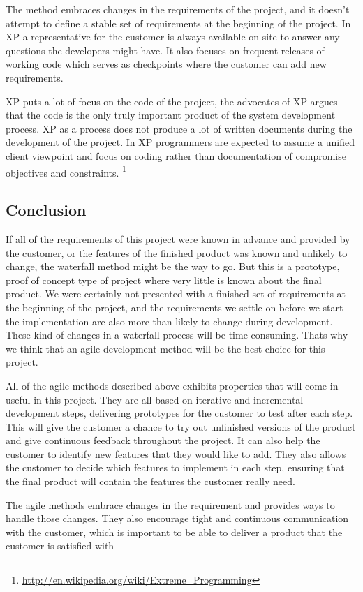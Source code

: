 The method embraces changes in the requirements of the project, and it doesn't attempt to define a stable set of requirements at the beginning of the project. In XP a representative for the customer is always available on site to answer any questions the developers might have. It also focuses on frequent releases of working code which serves as checkpoints where the customer can add new requirements.
 
XP puts a lot of focus on the code of the project, the advocates of XP argues that the code is the only truly important product of the system development process. XP as a process does not produce a lot of written documents during the development of the project. In XP programmers are expected to assume a unified client viewpoint and focus on coding rather than documentation of compromise objectives and constraints.
\footnote{\url{http://en.wikipedia.org/wiki/Extreme_Programming}}

\subsection{Conclusion}
If all of the requirements of this project were known in advance and provided by the customer, or the features of the finished product was known and unlikely to change, the waterfall method might be the way to go. But this is a prototype, proof of concept type of project where very little is known about the final product. We were certainly not presented with a finished set of requirements at the beginning of the project, and the requirements we settle on before we start the implementation are also more than likely to change during development. These kind of changes in a waterfall process will be time consuming. Thats why we think that an agile development method will be the best choice for this project.

All of the agile methods described above exhibits properties that will come in useful in this project. They are all based on iterative and incremental development steps, delivering prototypes for the customer to test after each step. This will give the customer a chance to try out unfinished versions of the product and give continuous feedback throughout the project. It can also help the customer to identify new features that they would like to add. They also allows the customer to decide which features to implement in each step, ensuring that the final product will contain the features the customer really need.

The agile methods embrace changes in the requirement and provides ways to handle those changes. They also encourage tight and continuous communication with the customer, which is important to be able to deliver a product that the customer is satisfied with

